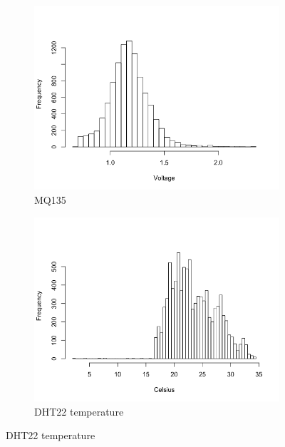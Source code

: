 \documentclass[11pt]{report}
\begin{document}
\begin{figure}[!tbp]
\begin{minipage}{1\linewidth}
        \end{minipage}
    \begin{minipage}{1\linewidth}
            \begin{subfigure}[t]{.5\linewidth}
                \includegraphics[width=\textwidth]{images/mq135_histogram}
                \caption{MQ135}
                \label{fig:mq135_histogram}
            \end{subfigure}
            \begin{subfigure}[t]{.5\linewidth}
            	\includegraphics[width=\textwidth]{images/temp_histogram}
            	\caption{DHT22 temperature}
            	\label{fig:temp_histogram}
	   \end{subfigure}

\end{minipage}
\end{figure}
\end{document}
